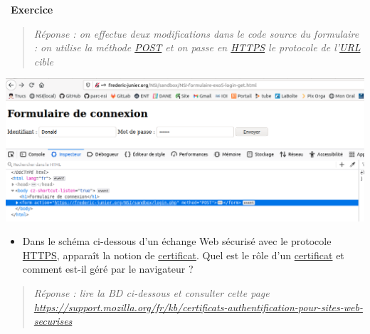 \documentclass[
  11pt,
]{article}
\providecommand{\tightlist}{%
  \setlength{\itemsep}{0pt}\setlength{\parskip}{0pt}}
\newcounter{exo}
\newenvironment{exercice}[1]
{\par \medskip   \addtocounter{exo}{1} \noindent  
\begin{bclogo}[arrondi =0.1,   noborder = true, logo=\bccrayon, marge=4]{~\textbf{Exercice} \textbf{\theexo} {\itshape #1} }  \par}
{
\end{bclogo}
 \par \bigskip }
\newcounter{logi}
\begin{document}
\begin{exercice}{}
\begin{quote}
\emph{Réponse : on effectue deux modifications dans le code source du
formulaire : on utilise la méthode \url{POST} et on passe en \url{HTTPS}
le protocole de l'\url{URL} cible}
\end{quote}

\includegraphics{images/login_https.png}\\

\begin{itemize}
\tightlist
\item
  Dans le schéma ci-dessous d'un échange Web sécurisé avec le protocole
  \href{https://developer.mozilla.org/fr/docs/Glossaire/https}{HTTPS},
  apparaît la notion de
  \href{https://developer.mozilla.org/fr/docs/Glossaire/Certificat_num\%C3\%A9rique}{certificat}.
  Quel est le rôle d'un
  \href{https://developer.mozilla.org/fr/docs/Glossaire/Certificat_num\%C3\%A9rique}{certificat}
  et comment est-il géré par le navigateur ?
\end{itemize}

\begin{quote}
\emph{Réponse : lire la BD ci-dessous et consulter cette page
\url{https://support.mozilla.org/fr/kb/certificats-authentification-pour-sites-web-securises}}
\end{quote}


\end{exercice}
\end{document}
